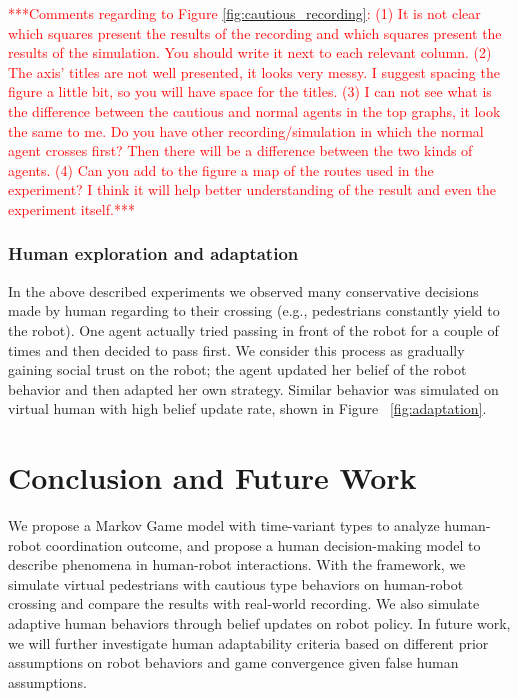 \documentclass[letterpaper, 10 pt, conference]{ieeeconf}  %
\begin{document}
\textcolor{red}{***Comments regarding to Figure \ref{fig:cautious_recording}: (1) It is not clear which squares present the results of the recording and which squares  present the results of the simulation. You should write it next to each relevant column. (2) The axis' titles are not well presented, it looks very messy. I suggest spacing the figure a little bit, so you will have space for the titles. (3) I can not see what is the difference between the cautious and normal agents in the top graphs, it look the same to me. Do you have other recording/simulation in which the normal agent crosses first? Then there will be a difference between the two kinds of agents. (4) Can you add to the figure a map of the routes used in the experiment? I think it will help better understanding of the result and even the experiment itself.*** }

\subsubsection{Human exploration and adaptation}
In the above described experiments we observed many conservative decisions made by human regarding to their crossing (e.g., pedestrians constantly yield to the robot). One agent actually tried passing in front of the robot for a couple of times and then decided to pass first. We consider this process as gradually gaining social trust on the robot; the agent updated her belief of the robot behavior and then adapted her own strategy. Similar behavior was simulated on virtual human with high belief update rate, shown in Figure ~\ref{fig:adaptation}.   

\section{Conclusion and Future Work}
We propose a Markov Game model with time-variant types to analyze human-robot coordination outcome, and propose a human decision-making model to describe phenomena in human-robot interactions. With the framework, we simulate virtual pedestrians with cautious type behaviors on human-robot crossing and compare the results with real-world recording. We also simulate adaptive human behaviors through belief updates on robot policy. In future work, we will further investigate human adaptability criteria based on different prior assumptions on robot behaviors and game convergence given false human assumptions.
\vspace{-0.2em}


\end{document}
